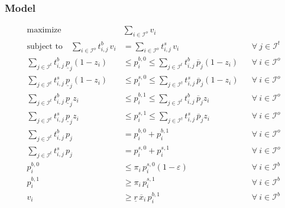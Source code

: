 \documentclass[11pt,parskip=full]{scrartcl}%
\newcommand*{\itokens}{\mathcal{I}^t}       %
\newcommand*{\iorders}{\mathcal{I}^o}       %
\newcommand*{\ibuyorders}{\mathcal{I}^b}    %
\begin{document}
\subsubsection*{Model}
\begin{small}
\begin{subequations}
\begin{align}
  \text{maximize} \quad & \sum\limits_{i \in \iorders} v_i
  \label{eq:mip1_objective}
  \\[2mm]
  \text{subject to} \quad
  \sum\limits_{i \in \iorders} t^b_{i,j} \, v_i
  &= \sum\limits_{i \in \iorders} t^s_{i,j} \, v_i
  && \forall \> j \in \itokens
  \label{eq:mip1_tokenbalance}
  \\[2mm]
  \sum\limits_{j \in \itokens} t^b_{i,j} \, \underline{p}_j (1-z_i)
  &\le p_i^{b,0} \le  \sum\limits_{j \in \itokens} t^b_{i,j} \, \overline{p}_j (1-z_i)
  && \forall \> i \in \iorders
  \label{eq:mip1_bounds_buyprice_0}
  \\[1mm]
  \sum\limits_{j \in \itokens} t^s_{i,j} \, \underline{p}_j (1-z_i)
  &\le p_i^{s,0} \le  \sum\limits_{j \in \itokens} t^s_{i,j} \, \overline{p}_j (1-z_i)
  && \forall \> i \in \iorders
  \label{eq:mip1_bounds_sellprice_0}
  \\[1mm]
  \sum\limits_{j \in \itokens} t^b_{i,j} \, \underline{p}_j z_i
  &\le p_i^{b,1} \le  \sum\limits_{j \in \itokens} t^b_{i,j} \, \overline{p}_j z_i
  && \forall \> i \in \iorders
  \label{eq:mip1_bounds_buyprice_1}
  \\[1mm]
  \sum\limits_{j \in \itokens} t^s_{i,j} \, \underline{p}_j z_i
  &\le p_i^{s,1} \le  \sum\limits_{j \in \itokens} t^s_{i,j} \, \overline{p}_j z_i
  && \forall \> i \in \iorders
  \label{eq:mip1_bounds_sellprice_1}
  \\[1mm]
  \sum\limits_{j \in \itokens} t^b_{i,j} \, p_j
  &= p_i^{b,0} + p_i^{b,1}
  && \forall \> i \in \iorders
  \label{eq:mip1_aggr_buyprice}
  \\[1mm]
  \sum\limits_{j \in \itokens} t^s_{i,j} \, p_j
  &= p_i^{s,0} + p_i^{s,1}
  && \forall \> i \in \iorders
  \label{eq:mip1_aggr_sellprice}
  \\[1mm]
  p^{b,0}_i
  &\le \pi_i \, p^{s,0}_i (1-\varepsilon)
  && \forall \> i \in \ibuyorders
  \label{eq:mip1_buyorder_disj_0}
  \\[1mm]
  p^{b,1}_i
  &\ge \pi_i \, p^{s,1}_i
  && \forall \> i \in \ibuyorders
  \label{eq:mip1_buyorder_disj_1}
  \\[1mm]
  v_i
  &\ge \underline{r} \, \overline{x}_i \, p^{b,1}_i
  && \forall \> i \in \ibuyorders
  \label{eq:mip1_buyorder_volume_lb}

\end{align}
\end{subequations}
\end{small}
\end{document}

